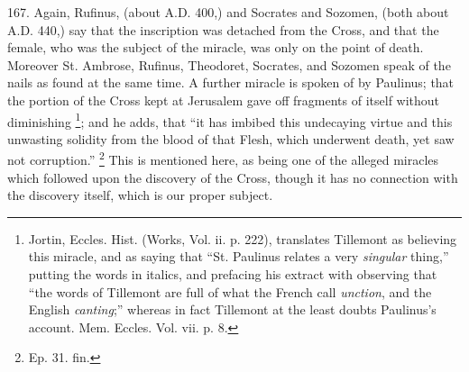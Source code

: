 167.
Again, Rufinus, (about A.D.
400,) and Socrates and Sozomen, (both about A.D.
440,) say that the inscription was detached from the Cross, and that
the female, who was the subject of the miracle, was only on the point
of death. Moreover St. Ambrose, Rufinus, Theodoret, Socrates, and
Sozomen speak of the nails as found at the same time. A further
miracle is spoken of by Paulinus; that the portion of the Cross kept at Jerusalem gave off fragments of itself without diminishing \footnote{Jortin, Eccles. Hist. (Works, Vol. ii. p. 222), translates Tillemont
as believing this miracle, and as saying that ``St. Paulinus relates a
very \emph{singular} thing,'' putting the words in italics, and
prefacing his extract with observing that ``the words of Tillemont are
full of what the French call \emph{unction}, and the English \emph{canting};''
whereas in fact Tillemont at the least doubts Paulinus's account. Mem.
Eccles. Vol. vii. p. 8.}; and he adds, that ``it has imbibed this undecaying virtue and
this unwasting solidity from the blood of that Flesh, which underwent
death, yet saw not corruption.'' \footnote{Ep. 31. fin.} This is mentioned here, as being one of the alleged miracles
which followed upon the discovery of the Cross, though it has no
connection with the discovery itself, which is our proper subject.

